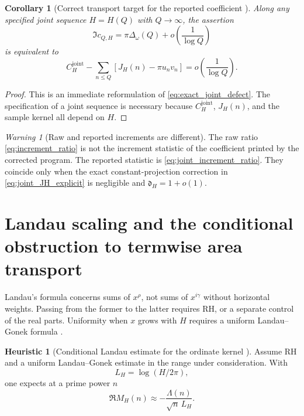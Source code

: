 \documentclass[11pt]{amsart}
\numberwithin{equation}{section}
\theoremstyle{plain}
\newtheorem{corollary}[theorem]{Corollary}
\theoremstyle{definition}
\newtheorem{heuristic}[theorem]{Heuristic}
\theoremstyle{remark}
\newtheorem{warning}[theorem]{Warning}
\newcommand{\RH}{\mathrm{RH}}
\newcommand{\1}{\mathbf{1}}
\begin{document}
\begin{corollary}[Correct transport target for the reported coefficient {}]
\label{cor:joint_transport_target}
Along any specified joint sequence \(H=H(Q)\) with \(Q\to\infty\), the
assertion
\begin{equation}
\Im c_{Q,H}
=
\pi\Delta_\omega(Q)
+
o\!\left(\frac1{\log Q}\right)
\label{eq:joint_transport_relation}
\end{equation}
is equivalent to
\begin{equation}
\boxed{
C_H^{\mathrm{joint}}
-
\sum_{n\leq Q}
\left[J_H(n)-\pi u_nv_n\right]
=
o\!\left(\frac1{\log Q}\right).
}
\label{eq:joint_transport_equivalent_target}
\end{equation}
\end{corollary}

\begin{proof}
This is an immediate reformulation of
\eqref{eq:exact_joint_defect}.  The specification of a joint sequence is
necessary because \(C_H^{\mathrm{joint}}\), \(J_H(n)\), and the sample
kernel all depend on \(H\).
\end{proof}

\begin{warning}[Raw and reported increments are different]
\label{warn:raw_joint_increment_difference}
The raw ratio \eqref{eq:increment_ratio} is not the increment statistic of
the coefficient printed by the corrected program.  The reported statistic
is \eqref{eq:joint_increment_ratio}.  They coincide only when the exact
constant-projection correction in \eqref{eq:joint_JH_explicit} is
negligible and \(\mathfrak d_H=1+o(1)\).
\end{warning}

\section{Landau scaling and the conditional obstruction to termwise area transport}
\label{sec:landau_scaling}

Landau's formula concerns sums of \(x^\rho\), not sums of \(x^{i\gamma}\)
without horizontal weights.  Passing from the former to the latter requires
\(\RH\), or a separate control of the real parts.  Uniformity when \(x\)
grows with \(H\) requires a uniform Landau--Gonek formula
\cite{Gonek1985,FordZaharescu2005}.

\begin{heuristic}[Conditional Landau estimate for the ordinate kernel {\normalfont[Heuristic]}]
\label{heur:landau_kernel}
Assume \(\RH\) and a uniform Landau--Gonek estimate in the range under
consideration.  With
\begin{equation}
L_H=\log(H/2\pi),
\label{eq:LH_definition}
\end{equation}
one expects at a prime power \(n\)
\begin{equation}
\Re M_H(n)
\approx
-\frac{\Lambda(n)}{\sqrt n\,L_H}.
\label{eq:MH_landau_heuristic}
\end{equation}
\end{heuristic}
\end{document}
